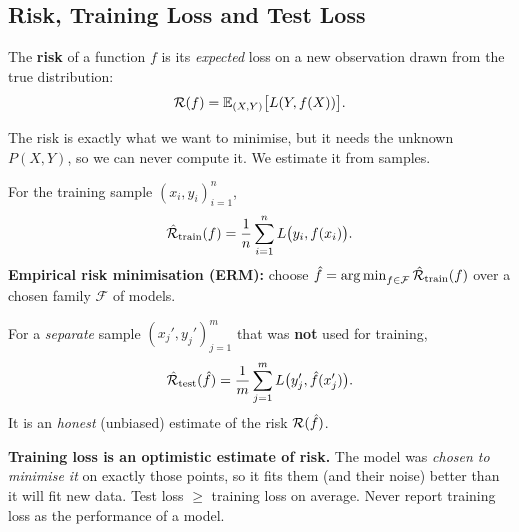 \subsection{Risk, Training Loss and Test Loss}

\begin{definition}
The \textbf{risk} of a function $f$ is its \emph{expected} loss on a new observation drawn from the true distribution:
\[
  \mathcal{R}(f)=\mathbb{E}_{(X,Y)}\big[L(Y,f(X))\big].
\]
\end{definition}

The risk is exactly what we want to minimise, but it needs the unknown $P(X,Y)$, so we can never compute it. We estimate it from samples.

\begin{definition}
For the training sample $(x_i,y_i)_{i=1}^n$,
\[
  \hat{\mathcal{R}}_{\text{train}}(f)=\frac1n\sum_{i=1}^{n}L\big(y_i,f(x_i)\big).
\]
\textbf{Empirical risk minimisation (ERM):} choose $\hat f=\operatorname*{arg\,min}_{f\in\mathcal F}\hat{\mathcal{R}}_{\text{train}}(f)$ over a chosen family $\mathcal F$ of models.
\end{definition}

\begin{definition}
For a \emph{separate} sample $(x_j',y_j')_{j=1}^{m}$ that was \textbf{not} used for training,
\[
  \hat{\mathcal{R}}_{\text{test}}(\hat f)=\frac1m\sum_{j=1}^{m}L\big(y_j',\hat f(x_j')\big).
\]
It is an \emph{honest} (unbiased) estimate of the risk $\mathcal{R}(\hat f)$.
\end{definition}

\begin{warning}
\textbf{Training loss is an optimistic estimate of risk.} The model was \emph{chosen to minimise it} on exactly those points, so it fits them (and their noise) better than it will fit new data. Test loss $\ge$ training loss on average. Never report training loss as the performance of a model.
\end{warning}

